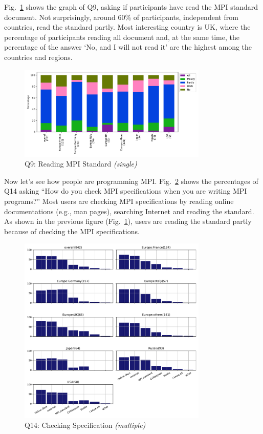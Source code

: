 \documentclass[conference,10pt,letterpaper]{IEEEtran}
\def\myquote#1{`#1'}
\begin{document}
Fig.~\ref{fig:reading-standard} shows the graph of Q9, asking if
participants have read the MPI standard document. Not surprisingly,
around 60\% of participants, independent from countries, read the
standard partly. Most interesting country is UK, where the percentage
of participants reading all document and, at the same time, the
percentage of the answer \myquote{No, and I will not read it} are the
highest among the countries and regions. 

\begin{figure}[htb]
\begin{center}
\includegraphics[width=9cm]{Figs/Q9.pdf}
\caption{Q9: Reading MPI Standard {\it(single)}}
\label{fig:reading-standard}
\end{center}
\end{figure}

Now let's see how people are programming
MPI. Fig.~\ref{fig:checking-spec} shows the percentages of Q14 asking
``How do you check MPI specifications when you are writing MPI
programs?'' Most users are checking MPI specifications by reading online
documentations (e.g., man pages), searching Internet and reading the
standard. As shown in the previous figure
(Fig.~\ref{fig:reading-standard}), users are reading the standard
partly because of checking the MPI specifications.

\begin{figure}[htb]
\begin{center}
\includegraphics[width=9cm]{Figs/Q14.pdf}
\caption{Q14: Checking Specification {\it(multiple)}}
\label{fig:checking-spec}
\end{center}
\end{figure}
\end{document}
